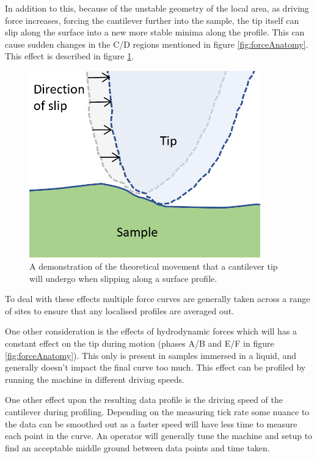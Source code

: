 In addition to this, because of the unstable geometry of the local area, as driving force increases, forcing the cantilever further into the sample, the tip itself can slip along the surface into a new more stable minima along the profile. This can cause sudden changes in the C/D regions mentioned in figure \ref{fig:forceAnatomy}. This effect is described in figure \ref{fig:tipSlip}. \cite{Ahmad2015}

\begin{figure}[h!]     %
        \begin{center}
          \includegraphics[width=100mm]{chapter2/tipslip.PNG}
\end{center}
\caption{A demonstration of the theoretical movement that a cantilever tip will undergo when slipping along a surface profile.}
\label{fig:tipSlip}                 %
\end{figure}

To deal with these effects multiple force curves are generally taken across a range of sites to ensure that any localised profiles are averaged out.

One other consideration is the effects of hydrodynamic forces which will has a constant effect on the tip during motion (phases A/B and E/F in figure \ref{fig:forceAnatomy}). This only is present in samples immersed in a liquid, and generally doesn't impact the final curve too much. This effect can be profiled by running the machine in different driving speeds.

One other effect upon the resulting data profile is the driving speed of the cantilever during profiling. Depending on the measuring tick rate some nuance to the data can be smoothed out as a faster speed will have less time to measure each point in the curve. An operator will generally tune the machine and setup to find an acceptable middle ground between data points and time taken.\cite{AFMSurfaceProfile}



